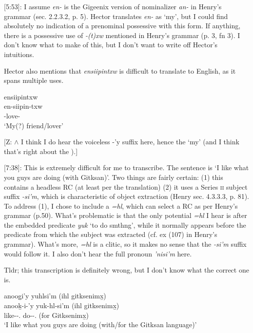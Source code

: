 [5:53]: I assume \textit{en-} is the Gigeenix version of nominalizer \textit{an-} in Henry's grammar (sec. 2.2.3.2, p. 5). Hector translates \textit{en-} as `my', but I could find absolutely no indication of a prenominal possessive with this form. If anything, there is a possessive use of \textit{-(t)xw} mentioned in Henry's grammar (p. 3, fn 3). I don't know what to make of this, but I don't want to write off Hector's intuitions.

Hector also mentions that \textit{ensiipintxw} is difficult to translate to English, as it spans multiple uses.

\begin{exe}
    \ex \glll ensiipintxw \\
    en-siipin-txw \\
    \Nmlz{}-love-\Val{} \\
    `My(?) friend/lover'
\end{exe}

[Z: \(\wedge\) I think I do hear the voiceless -'y suffix here, hence the `my' (and I think that's right about the \Nmlz).]

[7:38]: This is extremely difficult for me to transcribe. The sentence is `I like what you guys are doing (with Gitksan)'. Two things are fairly certain: (1) this contains a headless RC (at least per the translation) (2) it uses a Series \textsc{ii} subject suffix \textit{-si'm}, which is characteristic of object extraction (Henry sec. 4.3.3.3, p. 81). To address (1), I chose to include a \textit{=hl}, which can select a RC as per Henry's grammar (p.50). What's problematic is that the only potential \textit{=hl} I hear is after the embedded predicate \textit{yuk} `to do smthng', while it normally appears before the predicate from which the subject was extracted (cf. ex (107) in Henry's grammar). What's more, \textit{=hl} is a clitic, so it makes no sense that the \textit{-si'm} suffix would follow it. I also don't hear the full pronoun \textit{'nisi'm} here. 

Tldr; this transcription is definitely wrong, but I don't know what the correct one is. 

\begin{exe}
    \ex \glll anoog̱i'y yuhlsi'm (ihl gitksenimx̱) \\
    anooḵ-i-'y yuk-hl-si'm (ihl gitksenimx̱)\\
    like-\Tr{}-\Fsg.\Ii{} do-\Cn{}-\Spl{}.\Ii{} (for Gitksenimx̱)\\
    `I like what you guys are doing (with/for the Gitksan language)'
\end{exe}

